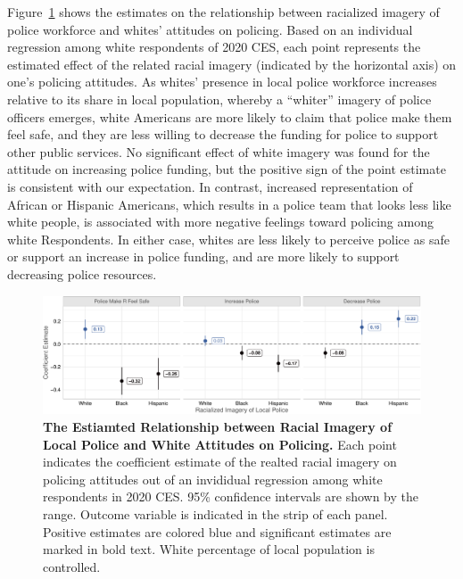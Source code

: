 \documentclass[
  12pt,
]{article}
\begin{document}
Figure~\ref{fig-baseline} shows the estimates on the relationship
between racialized imagery of police workforce and whites' attitudes on
policing. Based on an individual regression among white respondents of
2020 CES, each point represents the estimated effect of the related
racial imagery (indicated by the horizontal axis) on one's policing
attitudes. As whites' presence in local police workforce increases
relative to its share in local population, whereby a ``whiter'' imagery
of police officers emerges, white Americans are more likely to claim
that police make them feel safe, and they are less willing to decrease
the funding for police to support other public services. No significant
effect of white imagery was found for the attitude on increasing police
funding, but the positive sign of the point estimate is consistent with
our expectation. In contrast, increased representation of African or
Hispanic Americans, which results in a police team that looks less like
white people, is associated with more negative feelings toward policing
among white Respondents. In either case, whites are less likely to
perceive police as safe or support an increase in police funding, and
are more likely to support decreasing police resources.

\begin{figure}[tb]

{\centering \includegraphics{quarto_files/figure-pdf/fig-baseline-1.pdf}

}

\caption{\label{fig-baseline}\textbf{The Estiamted Relationship between
Racial Imagery of Local Police and White Attitudes on Policing.} Each
point indicates the coefficient estimate of the realted racial imagery
on policing attitudes out of an invididual regression among white
respondents in 2020 CES. 95\% confidence intervals are shown by the
range. Outcome variable is indicated in the strip of each panel.
Positive estimates are colored blue and significant estimates are marked
in bold text. White percentage of local population is controlled.}

\end{figure}
\end{document}
